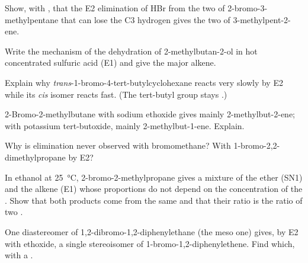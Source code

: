 \begin{exercise}[$\star\star$]\label{exo:b1:elimination:5}
Show, with , that the E2 elimination of HBr from the
two  of 2-bromo-3-methylpentane that can lose the C3
hydrogen gives the two  of 3-methylpent-2-ene.
\end{exercise}

\begin{exercise}[$\star\star$]\label{exo:b1:elimination:6}
Write the mechanism of the dehydration of 2-methylbutan-2-ol in hot
concentrated sulfuric acid (E1) and give the major alkene.
\end{exercise}

\begin{exercise}[$\star\star$]\label{exo:b1:elimination:7}
Explain why \textit{trans}-1-bromo-4-tert-butylcyclohexane reacts very
slowly by E2 while its \textit{cis} isomer reacts fast. (The tert-butyl
group stays .)
\end{exercise}

\begin{exercise}[$\star\star$]\label{exo:b1:elimination:8}
2-Bromo-2-methylbutane with sodium ethoxide gives mainly
2-methylbut-2-ene; with potassium tert-butoxide, mainly
2-methylbut-1-ene. Explain.
\end{exercise}

\begin{exercise}[$\star\star$]\label{exo:b1:elimination:9}
Why is elimination never observed with bromomethane? With
1-bromo-2,2-dimethylpropane by E2?
\end{exercise}

\begin{exercise}[$\star\star\star$]\label{exo:b1:elimination:10}
In ethanol at \qty{25}{\celsius}, 2-bromo-2-methylpropane gives a mixture
of the ether (SN1) and the alkene (E1) whose proportions do not depend on
the concentration of the . Show that both products come from
the same  and that their ratio is the ratio of two .
\end{exercise}

\begin{exercise}[$\star\star\star$]\label{exo:b1:elimination:11}
One diastereomer of 1,2-dibromo-1,2-diphenylethane (the meso one) gives,
by E2 with ethoxide, a single stereoisomer of 1-bromo-1,2-diphenylethene.
Find which, with a .
\end{exercise}

